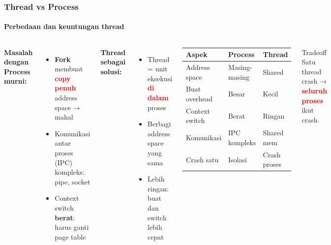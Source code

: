 \documentclass[t,aspectratio=169,xcolor=dvipsnames]{beamer}
\newcommand{\tem}[1]{\textbf{\textcolor{red}{#1}}}
\begin{document}
\begin{frame}
    \frametitle{Thread vs Process}
    \framesubtitle{Perbedaan dan keuntungan thread}
    \footnotesize

    \begin{columns}[T]
        \textbf{Masalah dengan Process murni:}
        \begin{itemize}
            \item \textbf{Fork} membuat \tem{copy penuh} address space → mahal
            \item Komunikasi antar proses (IPC) kompleks: pipe, socket
            \item Context switch \textbf{berat}: harus ganti page table
        \end{itemize}

        \vspace{0.2cm}
        \textbf{Thread sebagai solusi:}
        \begin{itemize}
            \item Thread = unit eksekusi \tem{di dalam} proses
            \item Berbagi address space yang sama
            \item Lebih ringan: buat dan switch lebih cepat
        \end{itemize}

        \begin{scriptsize}
        \begin{tabular}{p{}p{}p{}}
            \toprule
            \textbf{Aspek} & \textbf{Process} & \textbf{Thread} \\
            \midrule
            Address space & Masing-masing & Shared \\
            Buat overhead & Besar & Kecil \\
            Context switch & Berat & Ringan \\
            Komunikasi & IPC kompleks & Shared mem \\
            Crash satu & Isolasi & Crash proses \\
            \bottomrule
        \end{tabular}
        \end{scriptsize}

        \vspace{0.15cm}
        \begin{alertblock}{Tradeoff}
            \footnotesize Satu thread crash → \tem{seluruh proses} ikut crash.
        \end{alertblock}
    \end{columns}
\end{frame}
\end{document}
